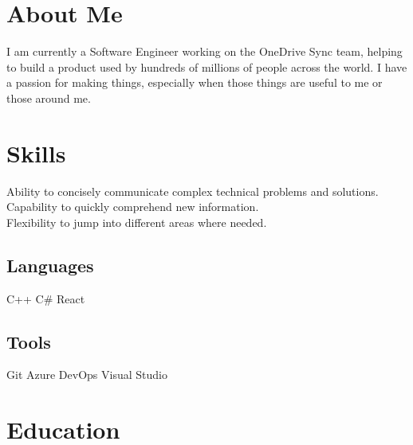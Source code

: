 \documentclass[letterpaper]{deedy-resume} %
\begin{document}
\begin{minipage}[t]{0.32\textwidth} %


\section{About Me}
I am currently a Software Engineer working on the OneDrive Sync team, helping to build a product used by hundreds of millions of people across the world. I have a passion for making things, especially when those things are useful to me or those around me.

\sectionspace


\section{Skills}
\raggedright
Ability to concisely communicate complex technical problems and solutions.\\
\vspace{0.5em}
Capability to quickly comprehend new information.\\
\vspace{0.5em}
Flexibility to jump into different areas where needed.\\
\vspace{0.5em}
\subsection{Languages}
C++ \textbullet{} C\# \textbullet{} React\\
\vspace{0.5em}
\subsection{Tools}
Git \textbullet{} Azure DevOps \textbullet{} Visual Studio

\sectionspace %


\section{Education}


\end{minipage}
\end{document}
